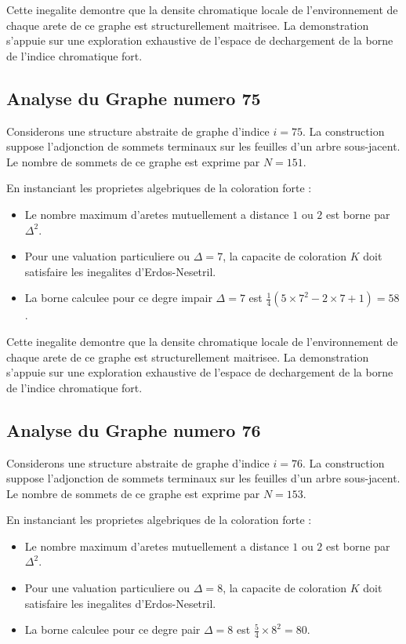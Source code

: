 \documentclass[11pt,a4paper]{article}
\begin{document}
Cette inegalite demontre que la densite chromatique locale de l'environnement de chaque arete de ce graphe est structurellement maitrisee. La demonstration s'appuie sur une exploration exhaustive de l'espace de dechargement de la borne de l'indice chromatique fort.

\subsection{Analyse du Graphe numero 75}
Considerons une structure abstraite de graphe d'indice $i = 75$. La construction suppose l'adjonction de sommets terminaux sur les feuilles d'un arbre sous-jacent. Le nombre de sommets de ce graphe est exprime par $N = 151$.

En instanciant les proprietes algebriques de la coloration forte :
\begin{itemize}
\item Le nombre maximum d'aretes mutuellement a distance $1$ ou $2$ est borne par $\Delta^2$.
\item Pour une valuation particuliere ou $\Delta = 7$, la capacite de coloration $K$ doit satisfaire les inegalites d'Erdos-Nesetril.
\item La borne calculee pour ce degre impair $\Delta = 7$ est $\frac{1}{4}(5 \times 7^2 - 2 \times 7 + 1) = 58$.
\end{itemize}

Cette inegalite demontre que la densite chromatique locale de l'environnement de chaque arete de ce graphe est structurellement maitrisee. La demonstration s'appuie sur une exploration exhaustive de l'espace de dechargement de la borne de l'indice chromatique fort.

\subsection{Analyse du Graphe numero 76}
Considerons une structure abstraite de graphe d'indice $i = 76$. La construction suppose l'adjonction de sommets terminaux sur les feuilles d'un arbre sous-jacent. Le nombre de sommets de ce graphe est exprime par $N = 153$.

En instanciant les proprietes algebriques de la coloration forte :
\begin{itemize}
\item Le nombre maximum d'aretes mutuellement a distance $1$ ou $2$ est borne par $\Delta^2$.
\item Pour une valuation particuliere ou $\Delta = 8$, la capacite de coloration $K$ doit satisfaire les inegalites d'Erdos-Nesetril.
\item La borne calculee pour ce degre pair $\Delta = 8$ est $\frac{5}{4} \times 8^2 = 80$.
\end{itemize}
\end{document}
